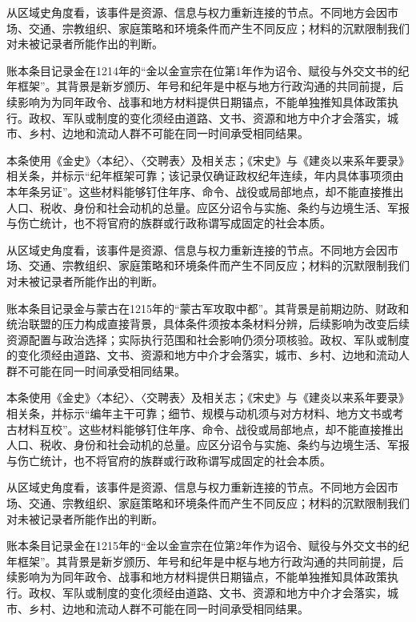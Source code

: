 从区域史角度看，该事件是资源、信息与权力重新连接的节点。不同地方会因市场、交通、宗教组织、家庭策略和环境条件而产生不同反应；材料的沉默限制我们对未被记录者所能作出的判断。

账本条目记录金在1214年的“金以金宣宗在位第1年作为诏令、赋役与外交文书的纪年框架”。其背景是新岁颁历、年号和纪年是中枢与地方行政沟通的共同前提，后续影响为为同年政令、战事和地方材料提供日期锚点，不能单独推知具体政策执行。政权、军队或制度的变化须经由道路、文书、资源和地方中介才会落实，城市、乡村、边地和流动人群不可能在同一时间承受相同结果。

本条使用《金史》〈本纪〉、〈交聘表〉及相关志；《宋史》与《建炎以来系年要录》相关条，并标示“纪年框架可靠；该记录仅确证政权纪年连续，年内具体事项须由本年条另证”。这些材料能够钉住年序、命令、战役或局部地点，却不能直接推出人口、税收、身份和社会动机的总量。应区分诏令与实施、条约与边境生活、军报与伤亡统计，也不将官府的族群或行政称谓写成固定的社会本质。

从区域史角度看，该事件是资源、信息与权力重新连接的节点。不同地方会因市场、交通、宗教组织、家庭策略和环境条件而产生不同反应；材料的沉默限制我们对未被记录者所能作出的判断。

账本条目记录金与蒙古在1215年的“蒙古军攻取中都”。其背景是前期边防、财政和统治联盟的压力构成直接背景，具体条件须按本条材料分辨，后续影响为改变后续资源配置与政治选择；实际执行范围和社会影响仍须分项核验。政权、军队或制度的变化须经由道路、文书、资源和地方中介才会落实，城市、乡村、边地和流动人群不可能在同一时间承受相同结果。

本条使用《金史》〈本纪〉、〈交聘表〉及相关志；《宋史》与《建炎以来系年要录》相关条，并标示“编年主干可靠；细节、规模与动机须与对方材料、地方文书或考古材料互校”。这些材料能够钉住年序、命令、战役或局部地点，却不能直接推出人口、税收、身份和社会动机的总量。应区分诏令与实施、条约与边境生活、军报与伤亡统计，也不将官府的族群或行政称谓写成固定的社会本质。

从区域史角度看，该事件是资源、信息与权力重新连接的节点。不同地方会因市场、交通、宗教组织、家庭策略和环境条件而产生不同反应；材料的沉默限制我们对未被记录者所能作出的判断。

账本条目记录金在1215年的“金以金宣宗在位第2年作为诏令、赋役与外交文书的纪年框架”。其背景是新岁颁历、年号和纪年是中枢与地方行政沟通的共同前提，后续影响为为同年政令、战事和地方材料提供日期锚点，不能单独推知具体政策执行。政权、军队或制度的变化须经由道路、文书、资源和地方中介才会落实，城市、乡村、边地和流动人群不可能在同一时间承受相同结果。

